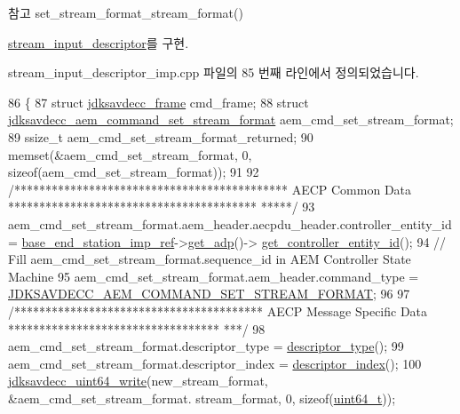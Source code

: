\begin{DoxySeeAlso}{참고}
set\+\_\+stream\+\_\+format\+\_\+stream\+\_\+format() 
\end{DoxySeeAlso}


\hyperlink{classavdecc__lib_1_1stream__input__descriptor_a7407f2ca9a5a63a404e5f96ccdbf31f3}{stream\+\_\+input\+\_\+descriptor}를 구현.



stream\+\_\+input\+\_\+descriptor\+\_\+imp.\+cpp 파일의 85 번째 라인에서 정의되었습니다.


\begin{DoxyCode}
86 \{
87     \textcolor{keyword}{struct }\hyperlink{structjdksavdecc__frame}{jdksavdecc\_frame} cmd\_frame;
88     \textcolor{keyword}{struct }\hyperlink{structjdksavdecc__aem__command__set__stream__format}{jdksavdecc\_aem\_command\_set\_stream\_format} 
      aem\_cmd\_set\_stream\_format;
89     ssize\_t aem\_cmd\_set\_stream\_format\_returned;
90     memset(&aem\_cmd\_set\_stream\_format, 0, \textcolor{keyword}{sizeof}(aem\_cmd\_set\_stream\_format));
91 
92     \textcolor{comment}{/******************************************** AECP Common Data ****************************************
      *****/}
93     aem\_cmd\_set\_stream\_format.aem\_header.aecpdu\_header.controller\_entity\_id = 
      \hyperlink{classavdecc__lib_1_1descriptor__base__imp_a550c969411f5f3b69f55cc139763d224}{base\_end\_station\_imp\_ref}->\hyperlink{classavdecc__lib_1_1end__station__imp_a471a74540ce6182fad0c17dfd010107e}{get\_adp}()->
      \hyperlink{classavdecc__lib_1_1adp_a0c0959a46658c0a22e9530334b2912da}{get\_controller\_entity\_id}();
94     \textcolor{comment}{// Fill aem\_cmd\_set\_stream\_format.sequence\_id in AEM Controller State Machine}
95     aem\_cmd\_set\_stream\_format.aem\_header.command\_type = 
      \hyperlink{group__command_ga5a4c1db8bb66e83da7bcdff6a4e2c7e7}{JDKSAVDECC\_AEM\_COMMAND\_SET\_STREAM\_FORMAT};
96 
97     \textcolor{comment}{/**************************************** AECP Message Specific Data **********************************
      ***/}
98     aem\_cmd\_set\_stream\_format.descriptor\_type = \hyperlink{classavdecc__lib_1_1descriptor__base__imp_aefc543029ab093823c3f5b9d84f0ccc4}{descriptor\_type}();
99     aem\_cmd\_set\_stream\_format.descriptor\_index = \hyperlink{classavdecc__lib_1_1descriptor__base__imp_ac23c0a35276c07cfce8c8660700c2135}{descriptor\_index}();
100     \hyperlink{group__endian_gaa294fd85c2d887032dad294c6833c903}{jdksavdecc\_uint64\_write}(new\_stream\_format, &aem\_cmd\_set\_stream\_format.
      stream\_format, 0, \textcolor{keyword}{sizeof}(\hyperlink{parse_8c_aec6fcb673ff035718c238c8c9d544c47}{uint64\_t}));

\end{DoxyCode}
